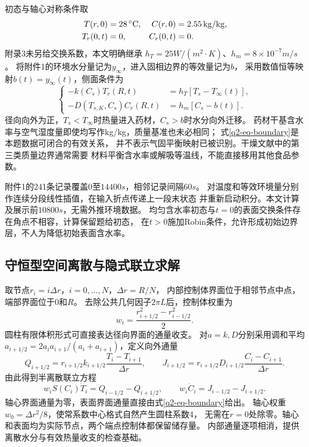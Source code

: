初态与轴心对称条件取
\begin{equation}
\begin{aligned}
 T(r,0)&=28\,{}^\circ\mathrm{C},& C(r,0)&=2.55\,\mathrm{kg/kg},\\
 T_r(0,t)&=0,& C_r(0,t)&=0.
\end{aligned}
\label{q2-eq-initial}
\end{equation}
附录3未另给交换系数，本文明确继承
$h_T=25\unit{W/(m^2\cdot K)}$、$h_m=8\times10^{-7}\unit{m/s}$。
将附件1的环境水分量记为$y_\infty$，进入固相边界的等效量记为$b$，
采用数值恒等映射$b(t)=y_\infty(t)$，侧面条件为
\begin{equation}
\left\{\begin{aligned}
 -k(C_s)T_r(R,t)&=h_T[T_s-T_\infty(t)],\\
 -D(T_{s,K},C_s)C_r(R,t)&=h_m[C_s-b(t)].
\end{aligned}\right.
\label{q2-eq-boundary}
\end{equation}
径向向外为正，$T_s<T_\infty$时热量进入药材，$C_s>b$时水分向外迁移。
药材干基含水率与空气湿度量即使均写作kg/kg，质量基准也未必相同；
式\eqref{q2-eq-boundary}是本题数据可闭合的有效关系，
并不表示气固平衡映射已被识别。干燥文献中的第三类质量边界通常需要
材料平衡含水率或解吸等温线\cite{dasilva2014,adrover2020}，不能直接移用其他食品参数。

附件1的241条记录覆盖$0$至$14400\unit{s}$，相邻记录间隔$60\unit{s}$。
对温度和等效环境量分别作连续分段线性插值，在输入折点传递上一段末状态
并重新启动积分。本文计算及展示前$10800\unit{s}$，无需外推环境数据。
均匀含水率初态与$t=0$的表面交换条件存在角点不相容，计算保留题给初态，
在$t>0$施加Robin条件，允许形成初始边界层，不人为降低初始表面含水率。

\subsection{守恒型空间离散与隐式联立求解}
取节点$r_i=i\Delta r$，$i=0,\ldots,N$，$\Delta r=R/N$，
内部控制体界面位于相邻节点中点，端部界面位于$0$和$R$。
去除公共几何因子$2\pi L$后，控制体权重为
\begin{equation}
 w_i=\frac{r_{i+1/2}^2-r_{i-1/2}^2}{2}.
\label{q2-eq-volume}
\end{equation}
圆柱有限体积形式可直接表达径向界面的通量收支\cite{dasilva2014}。
对$a=k,D$分别采用调和平均
$a_{i+1/2}=2a_i a_{i+1}/(a_i+a_{i+1})$，定义向外通量
\begin{equation}
 Q_{i+1/2}=r_{i+1/2}k_{i+1/2}\frac{T_i-T_{i+1}}{\Delta r},\qquad
 J_{i+1/2}=r_{i+1/2}D_{i+1/2}\frac{C_i-C_{i+1}}{\Delta r}.
\label{q2-eq-flux}
\end{equation}
由此得到半离散联立方程
\begin{equation}
 w_iS(C_i)\dot T_i=Q_{i-1/2}-Q_{i+1/2},\qquad
 w_i\dot C_i=J_{i-1/2}-J_{i+1/2}.
\label{q2-eq-fvm}
\end{equation}
轴心界面通量为零，表面界面通量直接由式\eqref{q2-eq-boundary}给出。
轴心权重$w_0=\Delta r^2/8$，使常系数中心格式自然产生圆柱系数4，
无需在$r=0$处除零。轴心和表面均为实际节点，两个端点控制体都保留储存量。
内部通量逐项相消，提供离散水分与有效热量收支的检查基础。

